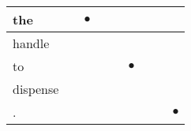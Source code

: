 \documentclass[landscape]{article}
\newcommand{\ssp}{\hspace{2pt}}
\newcommand{\mex}{\cellcolor{g}$\bullet$}
\begin{document}
\begin{tabular}{|l|p{10pt}|p{10pt}|p{10pt}|p{10pt}|p{10pt}|p{10pt}|p{10pt}|p{10pt}|}
\hline
\ssp \cellcolor{ref1}the \ssp&\hspace{2pt}&\hspace{2pt}\mex&\hspace{2pt}&\hspace{2pt}&\hspace{2pt}&\hspace{2pt}&\hspace{2pt}&\hspace{2pt}\\
\hline
\ssp handle \ssp&\hspace{2pt}&\hspace{2pt}&\hspace{2pt}&\hspace{2pt}&\hspace{2pt}&\hspace{2pt}&\hspace{2pt}&\hspace{2pt}\\
\hline
\ssp \cellcolor{ref4}to \ssp&\hspace{2pt}&\hspace{2pt}&\hspace{2pt}&\hspace{2pt}&\hspace{2pt}\mex&\hspace{2pt}&\hspace{2pt}&\hspace{2pt}\\
\hline
\ssp dispense \ssp&\hspace{2pt}&\hspace{2pt}&\hspace{2pt}&\hspace{2pt}&\hspace{2pt}&\hspace{2pt}&\hspace{2pt}&\hspace{2pt}\\
\hline
\ssp \cellcolor{ref7}. \ssp&\hspace{2pt}&\hspace{2pt}&\hspace{2pt}&\hspace{2pt}&\hspace{2pt}&\hspace{2pt}&\hspace{2pt}&\hspace{2pt}\mex\\
\hline
\end{tabular}
\end{document}
